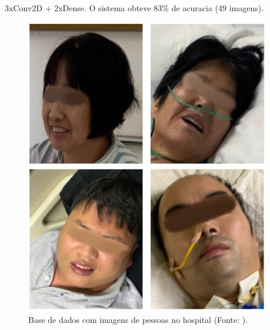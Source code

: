 \begin{frame}
    \frametitle{}
3xConv2D + 2xDense. 
O sistema obteve 83\% de acuracia (49 imagens).
\begin{figure}[!ht]
    \centering
    \caption{Base de dados com imagens de pessoas no hospital (Fonte: \textcite{chen2019real}).}
    \begin{minipage}[t]{0.45\textwidth}
    \centering
      \includegraphics[width=0.95\textwidth]{images/chen2019real-a.png}
    \end{minipage}
    \hfill
    \begin{minipage}[t]{0.45\textwidth}
    \centering
      \includegraphics[width=0.95\textwidth]{images/chen2019real-b.png}
    \end{minipage}
    \label{fig:chen2019real}
  \end{figure}
\end{frame}

